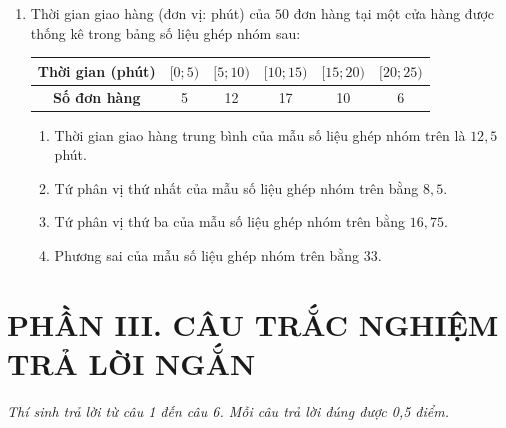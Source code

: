 \documentclass[12pt,a4paper]{article}
\begin{document}
\begin{enumerate}[label=\textbf{Câu \arabic*:}, leftmargin=*]
\item Thời gian giao hàng (đơn vị: phút) của $50$ đơn hàng tại một cửa hàng được thống kê trong bảng số liệu ghép nhóm sau:
\begin{center}
\begin{tabular}{|c|c|c|c|c|c|}
\hline
\textbf{Thời gian (phút)} & $[0; 5)$ & $[5; 10)$ & $[10; 15)$ & $[15; 20)$ & $[20; 25)$ \\ \hline
\textbf{Số đơn hàng} & 5 & 12 & 17 & 10 & 6 \\ \hline
\end{tabular}
\end{center}
\begin{enumerate}[label=\textbf{\alph*)}]
    \item Thời gian giao hàng trung bình của mẫu số liệu ghép nhóm trên là $12{,}5$ phút.
    \item Tứ phân vị thứ nhất của mẫu số liệu ghép nhóm trên bằng $8{,}5$.
    \item Tứ phân vị thứ ba của mẫu số liệu ghép nhóm trên bằng $16{,}75$.
    \item Phương sai của mẫu số liệu ghép nhóm trên bằng $33$.
\end{enumerate}

\end{enumerate}

\vspace{0.4cm}
\section*{\large PHẦN III. CÂU TRẮC NGHIỆM TRẢ LỜI NGẮN}
\textit{Thí sinh trả lời từ câu 1 đến câu 6. Mỗi câu trả lời đúng được 0,5 điểm.}
\end{document}
